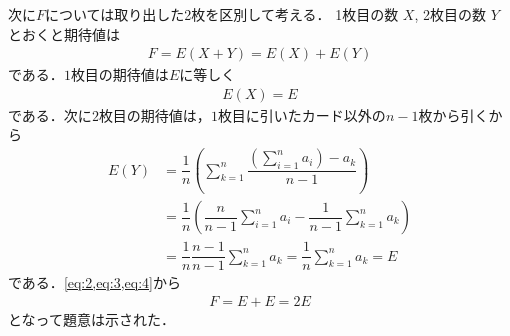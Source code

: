 \documentclass[../../main.tex]{subfiles}
\begin{document}
次に$F$については取り出した2枚を区別して考える．
1枚目の数 $X$, 2枚目の数 $Y$ とおくと期待値は
\begin{align}
  F = E(X+Y) = E(X) + E(Y) \label{eq:2}
\end{align}
である．$1$枚目の期待値は$E$に等しく
\begin{align}
  E(X) = E  \label{eq:3}
\end{align}
である．次に$2$枚目の期待値は，$1$枚目に引いたカード以外の$n-1$枚から引くから
\begin{align}
  E(Y)
  & = \dfrac{1}{n} \left( \sum_{k=1}^n \dfrac{(\sum_{i=1}^n a_i) - a_k}{n-1} \right) \\
  & = \dfrac{1}{n} \left( \dfrac{n}{n-1}\sum_{i=1}^n a_i - \dfrac{1}{n-1} \sum_{k=1}^n a_k \right) \\
  & = \dfrac{1}{n} \dfrac{n-1}{n-1} \sum_{k=1}^n a_k = \dfrac{1}{n} \sum_{k=1}^n a_k = E \label{eq:4}
\end{align}
である．\cref{eq:2,eq:3,eq:4}から
\begin{align}
  F = E + E = 2E
\end{align}
となって題意は示された．
\end{document}
